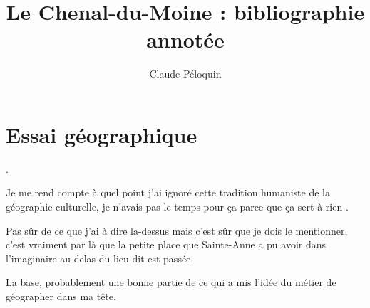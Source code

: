 \documentclass[12pt]{article}
\title{Le Chenal-du-Moine : bibliographie annotée}
\author{Claude Péloquin}
\date{}
\begin{document}
\maketitle
\section{Essai géographique}

\noindent
{}.

Je me rend compte à quel point j'ai ignoré cette tradition humaniste de la géographie culturelle, je n'avais \og pas le temps pour ça \fg parce que \og ça sert à rien \fg. 

\noindent
{}

Pas sûr de ce que j'ai à dire la-dessus mais c'est sûr que je dois le mentionner, c'est vraiment par là que la petite place que Sainte-Anne a pu avoir dans l'imaginaire au delas du lieu-dit est passée. 

\noindent
{}

La base, probablement une bonne partie de ce qui a mis l'idée du métier de géographer dans ma tête. 
\end{document}
